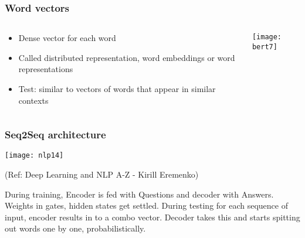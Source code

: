 \begin{frame}[fragile]\frametitle{Word vectors}

\begin{columns}
    \begin{column}[T]{0.5\linewidth}
			\begin{itemize}
			\item Dense vector for each word
			\item Called distributed representation, word embeddings or  word representations 
			\item Test: similar to vectors of words that appear in similar contexts
			\end{itemize}
    \end{column}
    \begin{column}[T]{0.5\linewidth}
			\begin{center}
			\texttt{[image: bert7]}
			\end{center}		  
    \end{column}
  \end{columns}

\end{frame}





\begin{frame}[fragile]\frametitle{Seq2Seq architecture}

\begin{center}
\texttt{[image: nlp14]}

\tiny{(Ref: Deep Learning and NLP A-Z - Kirill Eremenko)}
\end{center}
During training, Encoder is fed with Questions and decoder with Answers. Weights in gates, hidden states get settled. During testing for each sequence of input, encoder results in to a combo vector. Decoder takes this and starts spitting out words one by  one, probabilistically.

\end{frame}


